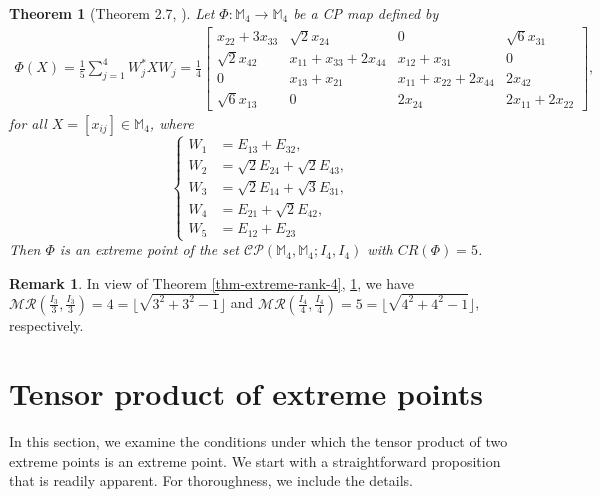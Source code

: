 \documentclass[10pt,reqno]{amsart}
\theoremstyle{definition}
\newtheorem{rmk}[defn]{Remark}
\theoremstyle{plain}
\newtheorem{thm}[defn]{Theorem}
\theoremstyle{remark}
\newcommand{\mbb}[1]{\mathbb{#1}}
\newcommand{\msc}[1]{\mathscr{#1}}
\newcommand{\M}[1]{\mbb{M}_{#1}}%
\newcommand{\Matrix}[1]{\begin{bmatrix}#1\end{bmatrix}}
\numberwithin{equation}{section}%
\begin{document}
    \begin{thm}[Theorem 2.7, \cite{Ohno10}]\label{thm-extreme-rank-5}
	Let $\Phi:\M{4}\to\M{4}$ be a CP map defined by 
  	\small
  	\begin{align}
  		\Phi(X)=\frac{1}{5}\sum_{j=1}^{4}W_j^*XW_j=\frac{1}{4}\Matrix{x_{22}+3x_{33}&\sqrt{2}x_{24}&0&\sqrt{6}x_{31}\\ \sqrt{2}x_{42}&x_{11}+x_{33}+2x_{44}&x_{12}+x_{31}&0\\ 0&x_{13}+x_{21}&x_{11}+x_{22}+2x_{44}&2x_{42}\\\sqrt{6}x_{13}&0&2x_{24}&2x_{11}+2x_{22}},
  	\end{align}
	\normalsize
	for all $X=[x_{ij}]\in\M{4}$, where
   	\small
   	\begin{equation}\label{eq-extreme-rank-5}
  		\begin{cases}
  			W_1&=E_{13}+E_{32}, \\
   			W_2&=\sqrt{2}E_{24}+\sqrt{2}E_{43},\\
  			W_3&=\sqrt{2}E_{14}+\sqrt{3}E_{31},\\
  			W_4&=E_{21}+\sqrt{2}E_{42}, \\
  			W_5&=E_{12}+E_{23}
 		\end{cases}
	\end{equation}
	\normalsize
	Then $\Phi$ is an extreme point of the set $\msc{CP}(\M{4},\M{4}; I_{4}, I_{4})$ with $CR(\Phi)=5$.
 \end{thm}
   
   
   
   \begin{rmk}
   	In view of Theorem \ref{thm-extreme-rank-4}, \ref{thm-extreme-rank-5}, we have $\msc{MR}(\frac{I_3}{3},\frac{I_3}{3})=4=\lfloor{\sqrt{3^2+3^2-1}}\rfloor$ and $\msc{MR}(\frac{I_4}{4},\frac{I_4}{4})=5=\lfloor{\sqrt{4^2+4^2-1}}\rfloor$, respectively.
   \end{rmk}
   
   
   
   

   \section{Tensor product of extreme points}\label{tensor product}
   
   
   In this section, we examine the conditions under which the tensor product of two extreme points is an extreme point. We start with a straightforward proposition that is readily apparent. For thoroughness, we include the details.
   
\end{document}
